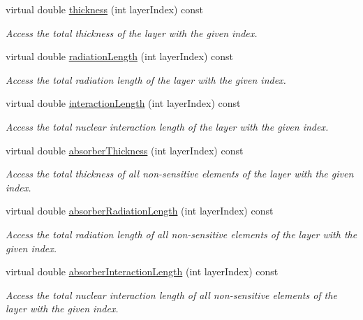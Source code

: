 \begin{DoxyCompactItemize}
virtual double \hyperlink{class_d_d4hep_1_1_d_d_rec_1_1_layering_extension_impl_a2bea36deda3a0b6962f4c24243749705}{thickness} (int layer\+Index) const
\begin{DoxyCompactList}\small\item\em Access the total thickness of the layer with the given index. \end{DoxyCompactList}\item 
virtual double \hyperlink{class_d_d4hep_1_1_d_d_rec_1_1_layering_extension_impl_ab858ea839a13b9e62499210f928dc031}{radiation\+Length} (int layer\+Index) const
\begin{DoxyCompactList}\small\item\em Access the total radiation length of the layer with the given index. \end{DoxyCompactList}\item 
virtual double \hyperlink{class_d_d4hep_1_1_d_d_rec_1_1_layering_extension_impl_a7aae4201942d846015d5defa357e2e9d}{interaction\+Length} (int layer\+Index) const
\begin{DoxyCompactList}\small\item\em Access the total nuclear interaction length of the layer with the given index. \end{DoxyCompactList}\item 
virtual double \hyperlink{class_d_d4hep_1_1_d_d_rec_1_1_layering_extension_impl_a15a4c3dbf225ffc5958e19f1ae21439e}{absorber\+Thickness} (int layer\+Index) const
\begin{DoxyCompactList}\small\item\em Access the total thickness of all non-\/sensitive elements of the layer with the given index. \end{DoxyCompactList}\item 
virtual double \hyperlink{class_d_d4hep_1_1_d_d_rec_1_1_layering_extension_impl_a81b2720593495043fbe86012b0936a37}{absorber\+Radiation\+Length} (int layer\+Index) const
\begin{DoxyCompactList}\small\item\em Access the total radiation length of all non-\/sensitive elements of the layer with the given index. \end{DoxyCompactList}\item 
virtual double \hyperlink{class_d_d4hep_1_1_d_d_rec_1_1_layering_extension_impl_aeae62d21c9f9d6a4b3a19db6d3cd28a3}{absorber\+Interaction\+Length} (int layer\+Index) const
\begin{DoxyCompactList}\small\item\em Access the total nuclear interaction length of all non-\/sensitive elements of the layer with the given index. \end{DoxyCompactList}\item 

\end{DoxyCompactItemize}
